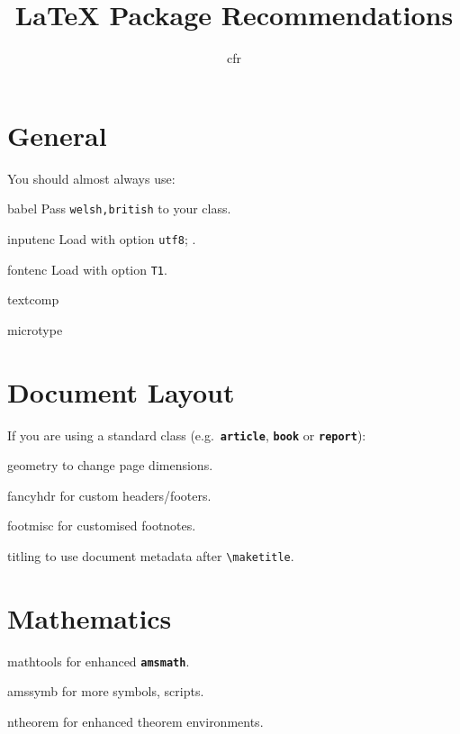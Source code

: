 \documentclass[a4paper,welsh,british,twocolumn]{article}
\title{\LaTeX{} Package Recommendations}
\author{cfr}
\date{}
\begin{document}
\maketitle\thispagestyle{fancy}
\newcommand*\lpack[1]{\texttt{\bfseries #1}}
\section{General}
You should almost always use:
\begin{pkgdescription}
  \item[babel] Pass \verb|welsh,british| to your class.
  \item[inputenc] Load with option \verb|utf8|; \verb||.
  \item[fontenc] Load with option \verb|T1|.
  \item[textcomp]
  \item[microtype]
\end{pkgdescription}
\section{Document Layout}
If you are using a standard class (e.g.\ \lpack{article}, \lpack{book} or \lpack{report}):
\begin{pkgdescription}
  \item[geometry] to change page dimensions.
  \item[fancyhdr] for custom headers/footers.
  \item[footmisc] for customised footnotes.
  \item[titling] to use document metadata after \verb|\maketitle|.
\end{pkgdescription}
\section{Mathematics}
\begin{pkgdescription}
  \item[mathtools] for enhanced \lpack{amsmath}.
  \item[amssymb] for more symbols, scripts.
  \item[ntheorem] for enhanced theorem environments.
\end{pkgdescription}
\end{document}
